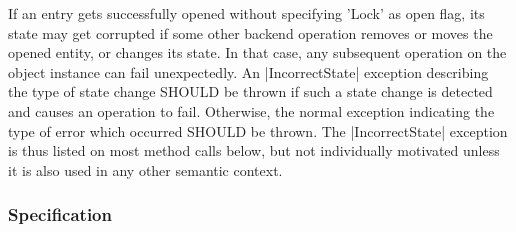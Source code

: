    If an entry gets successfully opened without specifying
   'Lock' as open flag, its state may get corrupted if some
   other backend operation removes or moves the opened entity,
   or changes its state.  In that case, any subsequent operation
   on the object instance can fail unexpectedly.  An
   |IncorrectState| exception describing the type of state
   change SHOULD be thrown if such a state change is detected
   and causes an operation to fail. Otherwise, the normal
   exception indicating the type of error which occurred
   SHOULD be thrown.  The |IncorrectState|
   exception is thus listed on most method calls below,
   but not individually motivated unless it is also used in any
   other semantic context.
 
 
 \subsubsection{Specification}
 
